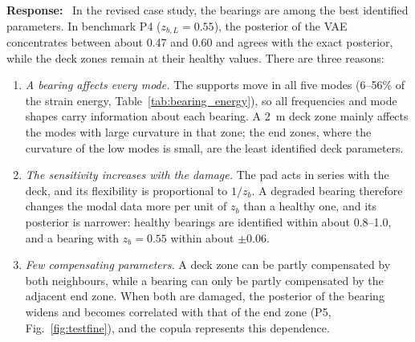 \documentclass[11pt]{article}
\newenvironment{response}{\par\smallskip\noindent\color{resp}\textbf{Response:}\ }{\par}
\begin{document}
\begin{response}
In the revised case study, the bearings are among the best identified parameters. In benchmark P4 ($z_{b,L}=0.55$),
the posterior of the VAE concentrates between about 0.47 and 0.60 and agrees with the exact posterior, while the deck
zones remain at their healthy values. There are three reasons:
\begin{enumerate}[leftmargin=*]
\item \emph{A bearing affects every mode.} The supports move in all five modes (6--56\% of the strain energy,
Table~\ref{tab:bearing_energy}), so all frequencies and mode shapes carry information about each bearing. A 2~m deck
zone mainly affects the modes with large curvature in that zone; the end zones, where the curvature of the low modes is
small, are the least identified deck parameters.
\item \emph{The sensitivity increases with the damage.} The pad acts in series with the deck, and its flexibility is
proportional to $1/z_b$. A degraded bearing therefore changes the modal data more per unit of $z_b$ than a healthy one,
and its posterior is narrower: healthy bearings are identified within about 0.8--1.0, and a bearing with $z_b=0.55$
within about $\pm0.06$.
\item \emph{Few compensating parameters.} A deck zone can be partly compensated by both neighbours, while a bearing can
only be partly compensated by the adjacent end zone. When both are damaged, the posterior of the bearing widens and
becomes correlated with that of the end zone (P5, Fig.~\ref{fig:testfine}), and the copula represents this dependence.
\end{enumerate}


\end{response}
\end{document}
